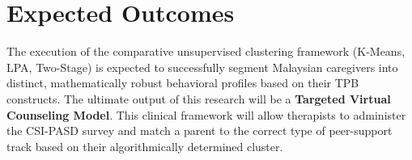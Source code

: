 \chapter{Expected Outcomes}

The execution of the comparative unsupervised clustering framework (K-Means, LPA, Two-Stage) is expected to successfully segment Malaysian caregivers into distinct, mathematically robust behavioral profiles based on their TPB constructs. The ultimate output of this research will be a \textbf{Targeted Virtual Counseling Model}. This clinical framework will allow therapists to administer the CSI-PASD survey and match a parent to the correct type of peer-support track based on their algorithmically determined cluster.
